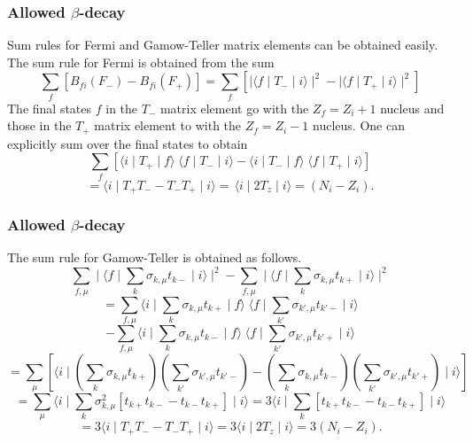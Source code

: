 \documentclass[compress]{beamer}
\begin{document}
 \frame
 {
 \frametitle{Allowed $\beta$-decay}
 \begin{small}
 {\scriptsize
Sum rules for Fermi and Gamow-Teller matrix elements can be obtained easily.\newline
The sum rule for Fermi is obtained from the sum
\[
\displaystyle\sum _{f} \left[ B_{fi}(F_{-}) - B_{fi}(F_{+}) \right]
= \displaystyle\sum _{f} \left[ \mid \langle f\mid  T_{-} \mid i\rangle\mid ^{2} -  \mid \langle f\mid  T_{+} \mid 
i\rangle\mid ^{2} \right]
\]
The final states $  f  $ in the $  T_{-}  $ matrix element go
with the $  Z_{f}=Z_{i}+1  $ nucleus and those in the $  T_{+}  $ matrix element
to with the $  Z_{f}=Z_{i}-1  $ nucleus. One can explicitly sum over the
final states to obtain
\[
\displaystyle\sum _{f} \left[ \langle i\mid  T_{+} \mid f\rangle \; \langle f\mid T_{-}\mid i\rangle -  \langle i\mid  T_{-} \mid f\rangle 
\; \langle f\mid T_{+}\mid i\rangle \right]
\]
\[
=   \langle i\mid  T_{+} T_{-} -  T_{-} T_{+}\mid i\rangle  =\, \langle i\mid  2T_{z}\mid i\rangle  = (N_{i}-Z_{i}).       
\]
 }
 \end{small}
 }
 \frame
 {
 \frametitle{Allowed $\beta$-decay}
 \begin{small}
 {\scriptsize
The sum rule for Gamow-Teller is obtained as follows.
\[
\displaystyle\sum _{f,\mu }  \mid \langle f\mid  \displaystyle\sum _{k} \sigma _{k,\mu } t_{k-} \mid 
i\rangle\mid ^{2}
- \displaystyle\sum _{f,\mu } \mid \langle f\mid  \displaystyle\sum _{k} \sigma _{k,\mu } t_{k+} \mid 
i\rangle\mid ^{2}
\]
\[
= \displaystyle\sum _{f,\mu }
\langle i\mid  \displaystyle\sum _{k} \sigma _{k,\mu } t_{k+} \mid f\rangle \; \langle f\mid  \displaystyle\sum _{k'} 
\sigma _{k',\mu } t_{k'-} \mid i\rangle
\]
\[
-  \displaystyle\sum _{f,\mu }
\langle i\mid  \displaystyle\sum _{k} \sigma _{k,\mu } t_{k-} \mid f\rangle \; \langle f\mid  \displaystyle\sum _{k'} 
\sigma _{k',\mu } t_{k'+} \mid i\rangle
\]
\[
= \displaystyle\sum _{\mu } \left[
\langle i\mid  \left( \displaystyle\sum _{k} \sigma _{k,\mu } t_{k+} \right)
    \left( \displaystyle\sum _{k'} \sigma _{k',\mu } t_{k'-} \right)
-   \left( \displaystyle\sum _{k} \sigma _{k,\mu } t_{k-} \right)
\left( \displaystyle\sum _{k'} \sigma _{k',\mu } t_{k'+} \right) \mid i\rangle
\right]
\]
\[
= \displaystyle\sum _{\mu }
\langle i\mid  \displaystyle\sum _{k}  \sigma ^{2}_{k,\mu } \left[ t_{k+} t_{k-} - t_{k-} t_{k+} \right] 
\mid i\rangle
= 3
\langle i\mid  \displaystyle\sum _{k} \left[ t_{k+} t_{k-} - t_{k-} t_{k+} \right] \mid i\rangle
\]
\[
=   3\langle i\mid  T_{+} T_{-} -  T_{-} T_{+}\mid i\rangle
= 3\langle i\mid  2T_{z}\mid i\rangle  = 3(N_{i}-Z_{i}). 
\]
 }
 \end{small}
 }
\end{document}
